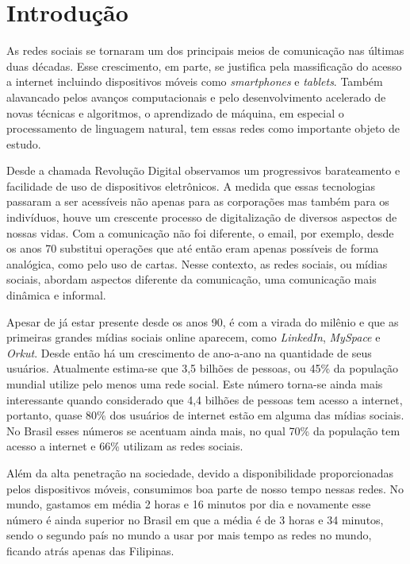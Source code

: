 \chapter{Introdução}

As redes sociais se tornaram um dos principais meios de comunicação nas últimas
duas décadas.
Esse crescimento, em parte, se justifica pela massificação do acesso a internet
incluindo dispositivos móveis como \textit{smartphones} e \textit{tablets}.
Também alavancado pelos avanços computacionais e pelo desenvolvimento acelerado
de novas técnicas e algoritmos, o aprendizado de máquina, em especial o
processamento de linguagem natural, tem essas redes como importante objeto de
estudo.

Desde a chamada Revolução Digital observamos um progressivos barateamento e
facilidade de uso de dispositivos eletrônicos.
A medida que essas tecnologias passaram a ser acessíveis não apenas para as
corporações mas também para os indivíduos, houve um crescente processo de
digitalização de diversos aspectos de nossas vidas.
Com a comunicação não foi diferente, o email, por exemplo, desde os anos 70
substitui operações que até então eram apenas possíveis de forma analógica, como
pelo uso de cartas.
Nesse contexto, as redes sociais, ou mídias sociais, abordam aspectos diferente
da comunicação, uma comunicação mais dinâmica e informal.

Apesar de já estar presente desde os anos 90, é com a virada do milênio e que as
primeiras grandes mídias sociais online aparecem, como \textit{LinkedIn},
\textit{MySpace} e \textit{Orkut}.
Desde então há um crescimento de ano-a-ano na quantidade de seus usuários.
Atualmente estima-se que 3,5 bilhões de pessoas, ou 45\% da população mundial
utilize pelo menos uma rede social.
Este número torna-se ainda mais interessante quando considerado que 4,4 bilhões
de pessoas tem acesso a internet, portanto, quase 80\% dos usuários de internet
estão em alguma das mídias sociais.
No Brasil esses números se acentuam ainda mais, no qual 70\% da população tem
acesso a internet e 66\% utilizam as redes sociais.

Além da alta penetração na sociedade, devido a disponibilidade proporcionadas
pelos dispositivos móveis, consumimos boa parte de nosso tempo nessas redes.
No mundo, gastamos em média 2 horas e 16 minutos por dia e novamente esse número
é ainda superior no Brasil em que a média é de 3 horas e 34 minutos, sendo o
segundo país no mundo a usar por mais tempo as redes no mundo, ficando atrás
apenas das Filipinas.

